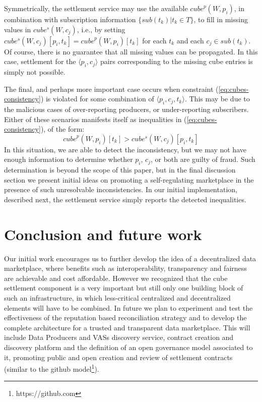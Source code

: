 \documentclass[chi_draft]{sigchi}
\begin{document}
{Symmetrically, the settlement service may use the available $ \mathit{cube}^p(W, p_i)$, in combination with subscription information $ \{\mathit{sub}(t_k) | t_k \in T \}$, to fill in missing values in 
$  \mathit{cube^s}(W, c_j)  $, i.e., by setting 
$ \mathit{cube^s}(W, c_j)[p_i, t_k]  =  \mathit{cube}^p(W, p_i)[t_k]$ for each $t_k$ and each $c_j \in \mathit{sub}(t_k)$.
%
Of course, there is no guarantee that all missing values can be propagated. 
In this case, settlement for the $\langle p_i, c_j \rangle$ pairs corresponding to the missing cube entries is simply not possible.

The final, and perhaps more important case occurs when constraint (\ref{eq:cubes-consistency}) is violated for some combination of $\langle p_i, c_j, t_k \rangle$.
This may be due to the malicious cases of over-reporting producers, or under-reporting subscribers.
%
Either of these  scenarios manifests itself as inequalities in (\ref{eq:cubes-consistency}), of the form:
\begin{equation}\label{eq:inconsistencies}
\mathit{cube}^p(W, p_i)[t_k] > \mathit{cube^s}(W, c_j)[p_i, t_k]
\end{equation}
In this situation, we are able to detect the inconsistency, but we may not have enough information to determine whether $p_i$, $c_j$, or both are guilty of fraud.
Such determination is beyond the scope of this paper, but in the final discussion section we present initial ideas on promoting a self-regulating marketplace in the presence of such unresolvable inconsistencies.
%
In our initial implementation, described next, the settlement service simply reports the detected inequalities.



\section{Conclusion and future work}
Our initial work encourages us to further develop the idea of a decentralized data marketplace, where benefits such as interoperability, transparency and fairness are achievable and cost affordable. However we recognized that the cube settlement component is a very important but still only one building block of such an infrastructure, in which less-critical centralized and decentralized elements will have to be combined. In future we plan to experiment and test the effectiveness of the reputation based reconciliation strategy and to develop the complete architecture for a trusted and transparent data marketplace. This will include Data Producers and VASs discovery service, contract creation and discovery platform and the definition of an open governance model associated to it, promoting public and open creation and review of settlement contracts (similar to the github model\footnote{https://github.com}).



}
\end{document}
